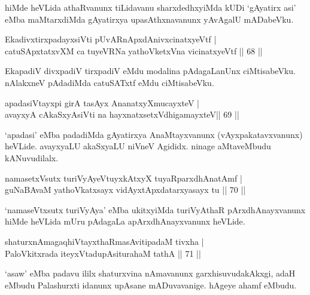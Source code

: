 \begin{artha} 
hiMde heVLida athaRvanunx tiLidavanu sharxdedhxyiMda kUDi `gAyatirx 
asi' eMba maMtarxdiMda gAyatirxya upasAthxnavanunx yAvAgalU mADabeVku.
\end{artha}

\begin{shl}
EkadivxtirxpadayxsiVti pUvARnApxdAnivxcinatxyeVtf  | \\
catuSApxtatxvXM ca tuyeVRNa yathoVketxVna vicinatxyeVtf \hfill||  68 || 
\end{shl}

\begin{artha} 
EkapadiV divxpadiV tirxpadiV eMdu modalina pAdagaLanUnx ciMtisabeVku. 
nAlakxneV pAdadiMda catuSATxtf eMdu ciMtisabeVku.
\end{artha}

\begin{shl}
apadasiVtayxpi girA tasAyx AnanatxyXmucayxteV  | \\
avayxyA cAkaSxyA\s siVti na hayxnatxsetxV\s dhigamayxteV\hfill ||  69 || 
\end{shl}

\begin{artha} 
`apadasi' eMba padadiMda gAyatirxya AnaMtayxvanunx 
(vAyxpakatavxvanunx) heVLide. avayxyaLU akaSxyaLU niVneV Agididx. 
ninage aMtaveMbudu kANuvudilalx.  
\end{artha}

\begin{shl}
namasetxV\s sutx turiVyAyeVtuyxkAtxyX tuyaRparxdhAnatAmf | \\
guNaBAvaM yathoVkatxsayx vidAyxtApxdatarxyasayx tu \hfill||  70 || 
\end{shl}

\begin{artha} 
`namaseVtx\s sutx turiVyAya' eMba ukitxyiMda turiVyAthaR pArxdhAnayxvanunx hiMde heVLida mUru pAdagaLa 
apArxdhAnayxvanunx heVLide. 
\end{artha}

\begin{shl}
shaturxnAmagaqhiVtayxthaRmasAvitipadaM tivxha | \\
PaloVkitxrada iteyxVtadupAsiturahaM tathA \hfill||  71 || 
\end{shl}

\begin{artha} 
`asaw' eMba padavu ililx shaturxvina nAmavanunx garxhisuvudakAkxgi, adaH eMbudu Palashurxti 
idanunx upAsane mADuvavanige. hAgeye ahamf eMbudu.
\end{artha}

